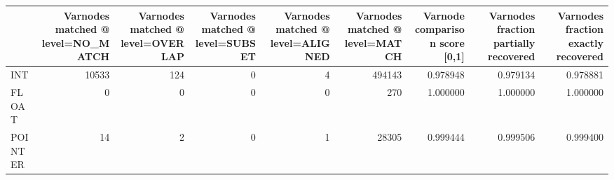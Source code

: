\begin{tabular}{lrrrrrrrr}
\toprule
{} &  Varnodes matched @ level=NO\_MATCH &  Varnodes matched @ level=OVERLAP &  Varnodes matched @ level=SUBSET &  Varnodes matched @ level=ALIGNED &  Varnodes matched @ level=MATCH &  Varnode comparison score [0,1] &  Varnodes fraction partially recovered &  Varnodes fraction exactly recovered \\
\midrule
INT     &                              10533 &                               124 &                                0 &                                 4 &                          494143 &                        0.978948 &                               0.979134 &                             0.978881 \\
FLOAT   &                                  0 &                                 0 &                                0 &                                 0 &                             270 &                        1.000000 &                               1.000000 &                             1.000000 \\
POINTER &                                 14 &                                 2 &                                0 &                                 1 &                           28305 &                        0.999444 &                               0.999506 &                             0.999400 \\
\bottomrule
\end{tabular}
